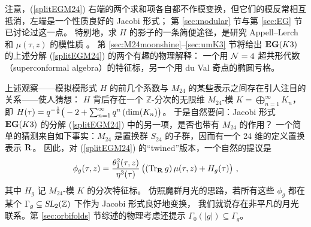 \documentclass[11pt,a4paper,fontset=windows]{ctexart}
\numberwithin{equation}{section}
\newcommand{\SL}{\operatorname{\textsl{SL}}}      %
\newcommand{\ZZ}{\mathbb{Z}}
\newcommand{\Z}{\mathbb{Z}}
\def\inf{\infty}
\def\m{\mu}
\def\t{\tau}
\def\th{\theta}
\newcommand{\tr}{\operatorname{Tr}}
\newcommand{\be}{\begin{equation}}
\newcommand{\ee}{\end{equation}}
\begin{document}

注意，(\ref{splitEGM24}) 右端的两个求和项各自都不作模变换，但它们的模反常相互抵消，左端是一个性质良好的 Jacobi 形式；
第 \ref{sec:modular} 节与第 \ref{sec:EG} 节已讨论过这一点。
特别地，求 $H$ 的影子的一条简便途径，是研究 Appell--Lerch 和 $\mu(\t,z)$ 的模性质 \cite{Eguchi2009a,Zwegers2008}。
第 \ref{sec:M24moonshine}--\ref{sec:umK3} 节将给出 ${\bf EG}(K3)$ 的上述分解 (\ref{splitEGM24}) 的两个有趣的物理解释：
一个用 ${\cal N}=4$ 超共形代数（superconformal algebra）的特征标，另一个用 du Val 奇点的椭圆亏格。



上述观察——模拟模形式 $H$ 的前几个系数与 $M_{24}$ 的某些表示之间存在引人注目的关系——使人猜想：
$H$ 背后存在一个 $\Z$-分次的无限维 $M_{24}$-模 $K= \bigoplus_{n=1}^\inf  K_n$，
即 $H(\t) =q^{-\frac{1}{8}}\big( -2  + \sum_{n=1}^\inf q^n\,({\rm dim}({K_n} )\big)$。
于是自然要问：Jacobi 形式 ${\bf EG}(K3)$ 的分解 (\ref{splitEGM24}) 中的另一项，是否也带有 $M_{24}$ 的作用？
一个简单的猜测来自如下事实：$M_{24}$ 是置换群 $S_{24}$ 的子群，因而有一个 24 维的定义置换表示 ${\bf R}$。
因此，对 (\ref{splitEGM24}) 的“twined”版本，一个自然的提议是
\be\label{K3_EG_Fou}
	 \phi_g(\t,z) 
 		=  \frac{\th_1^2(\t,z)}{\eta^3(\t)} \,\big((\tr_{\bf R} {g } ) \,\m(\t,z) + H_g(\t)\big)~,
	\ee
其中 $H_g$ 记 $M_{24}$-模 $K$ 的分次特征标。
仿照魔群月光的思路，若所有这些 $\phi_g$ 都在某个 $\Gamma_g \subseteq \SL_2(\ZZ)$ 下作为 Jacobi 形式良好地变换，
我们就说存在非平凡的月光联系。第 \ref{sec:orbifolds} 节综述的物理考虑还提示 $ \Gamma_0(|g|) \subseteq \Gamma_g$。

\end{document}
